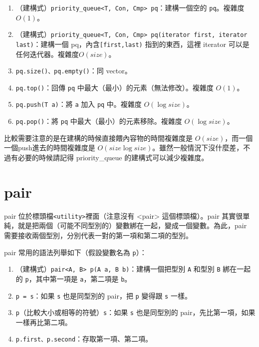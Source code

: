 \documentclass[a4paper, 11pt, oneside]{book}
\begin{document}
\begin{enumerate}
    \item （建構式）\texttt{priority\_queue<T, Con, Cmp> pq}：建構一個空的 \texttt{pq}。複雜度 $O(1)$。
    \item （建構式）\texttt{priority\_queue<T, Con, Cmp> pq(iterator first, iterator last)}：建構一個 pq，內含\texttt{[first,last)} 指到的東西，這裡 iterator 可以是任何迭代器。複雜度$O(size)$。
    \item \texttt{pq.size()、pq.empty()}：同 vector。
    \item \texttt{pq.top()}：回傳 \texttt{pq} 中最大（最小）的元素（無法修改）。複雜度 $O(1)$。
    \item \texttt{pq.push(T a)}：將 \texttt{a} 加入 \texttt{pq} 中。複雜度 $O(\log size)$。
    \item \texttt{pq.pop()}：將 \texttt{pq} 中最大（最小）的元素移除。複雜度 $O(\log size)$。
\end{enumerate}

比較需要注意的是在建構的時候直接餵內容物的時間複雜度是 $O(size)$，而一個一個push進去的時間複雜度是 $O(size \log size)$。雖然一般情況下沒什麼差，不過有必要的時候請記得 priority\_queue 的建構式可以減少複雜度。

\section{pair}

pair 位於標頭檔\texttt{<utility>}裡面（注意沒有 <pair> 這個標頭檔）。pair 其實很單純，就是把兩個（可能不同型別的）變數綁在一起，變成一個變數。為此，pair 需要接收兩個型別，分別代表一對的第一項和第二項的型別。

pair 常用的語法列舉如下（假設變數名為 \texttt{p}）：

\begin{enumerate}
    \item （建構式）\texttt{pair<A, B> p(A a, B b)}：建構一個把型別 \texttt{A} 和型別 \texttt{B} 綁在一起的 \texttt{p}，其中第一項是 \texttt{a}，第二項是 \texttt{b}。
    \item \texttt{p = s}：如果 \texttt{s} 也是同型別的 pair，把 \texttt{p} 變得跟 \texttt{s} 一樣。
    \item \texttt{p}（比較大小或相等的符號）\texttt{s}：如果 \texttt{s} 也是同型別的 pair，先比第一項，如果一樣再比第二項。
    \item \texttt{p.first、p.second}：存取第一項、第二項。
\end{enumerate}
\end{document}

